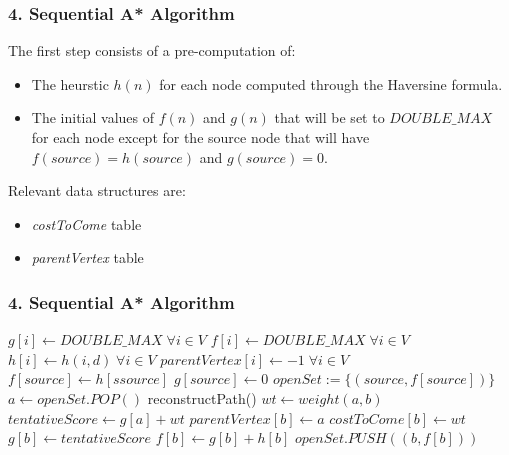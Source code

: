 \documentclass[12pt]{beamer}
\begin{document}
	\begin{frame}
		\frametitle{4. Sequential A* Algorithm}
		The first step consists of a pre-computation of:
		\begin{itemize}
		\item The heurstic $h(n)$ for each node computed through the Haversine formula.
		\item The initial values of $f(n)$ and $g(n)$ that will be set to $DOUBLE\_MAX$ for each
				node except for the source node that will have $f(source) = h(source)$ and $g(source) = 0$.
		\end{itemize}
		Relevant data structures are:
		\begin{itemize}
			\item \textit{costToCome} table
			\item \textit{parentVertex} table
		  \end{itemize}
	\end{frame}

	\begin{frame}[allowframebreaks] 
		\frametitle{4. Sequential A* Algorithm}
		\begin{algorithmic}[1]
			\State $g[i] \gets DOUBLE\_MAX \;\forall i \in V$\;
			\State $f[i] \gets DOUBLE\_MAX \;\forall i \in V$\;
			\State $h[i] \gets h(i, d) \; \forall i \in V$\;
			\State $parentVertex[i] \gets -1 \; \forall i \in V$\;
			\State $f[source] \gets h[ssource]$\;
			\State $g[source] \gets 0$\;
			\State $openSet := \{(source, f[source])\}$\;
				\State $a \gets openSet.POP()$\;
				\State reconstructPath()\;
			\EndIf
				\State $wt \gets weight(a, b)$\;
				\State $tentativeScore \gets g[a] + wt$\;
					\State $parentVertex[b] \gets a$\;
					\State $costToCome[b] \gets wt$\;
					\State $g[b] \gets tentativeScore$\;
					\State $f[b] \gets g[b] + h[b]$\;
					\State $openSet.PUSH((b, f[b]))$\;
				\EndIf
			\EndFor
			\EndWhile
			\EndFunction
		  \end{algorithmic}
	\end{frame}
\end{document}
